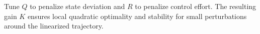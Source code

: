 \begin{tcolorbox}[title=LQR Design Summary, colback=white!98!gray]
Tune $Q$ to penalize state deviation and $R$ to penalize control effort. 
The resulting gain $K$ ensures local quadratic optimality and stability 
for small perturbations around the linearized trajectory.
\end{tcolorbox}
